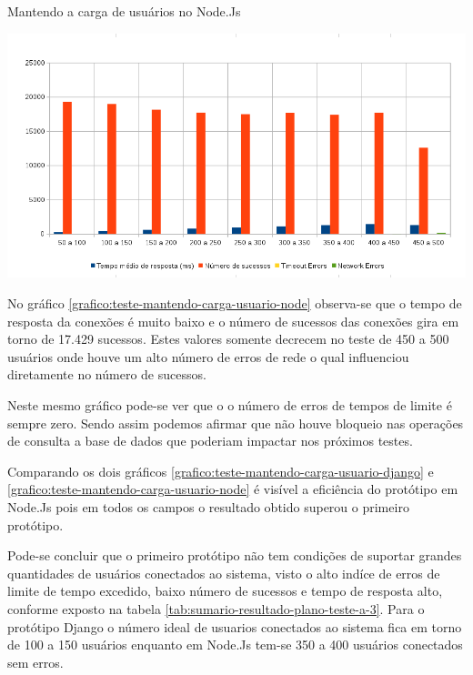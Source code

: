   \begin{grafico}[H]
    \setlength{\abovecaptionskip}{5pt}
    \setlength{\belowcaptionskip}{0pt}
    \label{grafico:teste-mantendo-carga-usuario-node}
    \caption[Mantendo a carga de usuários no Node.Js]
	    {Mantendo a carga de usuários no Node.Js}
    \centering
    \includegraphics[width=.80\textwidth]{imagem/graficos/grafico_node_plano_de_teste_3.png}
    \captionsetup[grafico]{justification=centering}
  \end{grafico}

  No gráfico \ref{grafico:teste-mantendo-carga-usuario-node}  observa-se que o tempo de resposta da conexões 
  é muito baixo e o número de sucessos das conexões gira em torno de 17.429 sucessos. Estes valores somente 
  decrecem no teste de 450 a 500 usuários onde houve um alto número de erros de rede o qual influenciou diretamente
  no número de sucessos.
  
  Neste mesmo gráfico pode-se ver que o o número de erros de tempos de limite é sempre zero. Sendo assim podemos afirmar
  que não houve bloqueio nas operações de consulta a base de dados que poderiam impactar nos próximos testes.
  
  Comparando os dois gráficos \ref{grafico:teste-mantendo-carga-usuario-django} e \ref{grafico:teste-mantendo-carga-usuario-node} é
  visível a eficiência do protótipo em Node.Js pois em todos os campos o resultado obtido superou o primeiro protótipo.
  
  Pode-se concluir que o primeiro protótipo não tem condições de suportar grandes quantidades de usuários conectados ao
  sistema, visto o alto indíce de erros de limite de tempo excedido, baixo número de sucessos e tempo de resposta alto, 
  conforme exposto na tabela \ref{tab:sumario-resultado-plano-teste-a-3}. Para o protótipo Django o número ideal de usuarios
  conectados ao sistema fica em torno de 100 a 150 usuários enquanto em Node.Js tem-se 350 a 400 usuários conectados sem 
  erros.
  
  